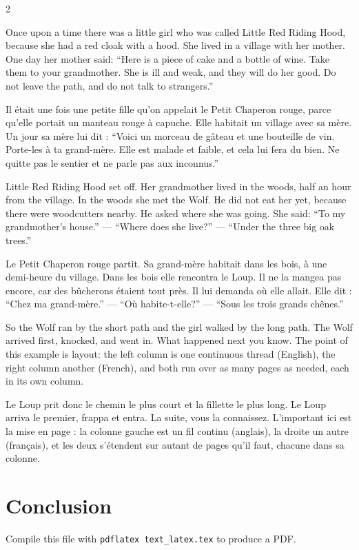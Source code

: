 \documentclass[11pt]{article}
\begin{document}
\begin{paracol}{2}

Once upon a time there was a little girl who was called Little Red Riding Hood, because she had a red cloak with a hood. She lived in a village with her mother. One day her mother said: ``Here is a piece of cake and a bottle of wine. Take them to your grandmother. She is ill and weak, and they will do her good. Do not leave the path, and do not talk to strangers.''

\switchcolumn

Il était une fois une petite fille qu'on appelait le Petit Chaperon rouge, parce qu'elle portait un manteau rouge à capuche. Elle habitait un village avec sa mère. Un jour sa mère lui dit : ``Voici un morceau de gâteau et une bouteille de vin. Porte-les à ta grand-mère. Elle est malade et faible, et cela lui fera du bien. Ne quitte pas le sentier et ne parle pas aux inconnus.''

\switchcolumn

Little Red Riding Hood set off. Her grandmother lived in the woods, half an hour from the village. In the woods she met the Wolf. He did not eat her yet, because there were woodcutters nearby. He asked where she was going. She said: ``To my grandmother's house.'' --- ``Where does she live?'' --- ``Under the three big oak trees.''

\switchcolumn

Le Petit Chaperon rouge partit. Sa grand-mère habitait dans les bois, à une demi-heure du village. Dans les bois elle rencontra le Loup. Il ne la mangea pas encore, car des bûcherons étaient tout près. Il lui demanda où elle allait. Elle dit : ``Chez ma grand-mère.'' --- ``Où habite-t-elle?'' --- ``Sous les trois grands chênes.''

\switchcolumn

So the Wolf ran by the short path and the girl walked by the long path. The Wolf arrived first, knocked, and went in. What happened next you know. The point of this example is layout: the left column is one continuous thread (English), the right column another (French), and both run over as many pages as needed, each in its own column.

\switchcolumn

Le Loup prit donc le chemin le plus court et la fillette le plus long. Le Loup arriva le premier, frappa et entra. La suite, vous la connaissez. L'important ici est la mise en page : la colonne gauche est un fil continu (anglais), la droite un autre (français), et les deux s'étendent sur autant de pages qu'il faut, chacune dans sa colonne.

\end{paracol}

\section{Conclusion}

Compile this file with \texttt{pdflatex text\_latex.tex} to produce a PDF.
\end{document}
